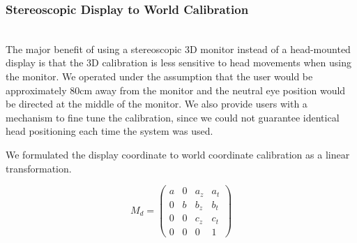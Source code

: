 \documentclass[pageno]{jpaper}
\begin{document}
\subsubsection{Stereoscopic Display to World Calibration}$ $\\
The major benefit of using a stereoscopic 3D monitor instead of a head-mounted display is that the 3D calibration is less sensitive to
head movements when using the monitor. We operated under the assumption that the user would be approximately 80cm away from the monitor
and the neutral eye position would be directed at the middle of the monitor. We also provide users with a mechanism to fine tune the
calibration, since we could not guarantee identical head positioning each time the system was used.

We formulated the display coordinate to world coordinate calibration as a linear transformation.

$$M_{d} = \left(
\begin{array}{cccc}
a & 0 & a_z & a_t \\
0 & b & b_z & b_t \\
0 & 0 & c_z & c_t \\ 
0 & 0 &   0 &   1
\end{array}\right)$$
\end{document}
